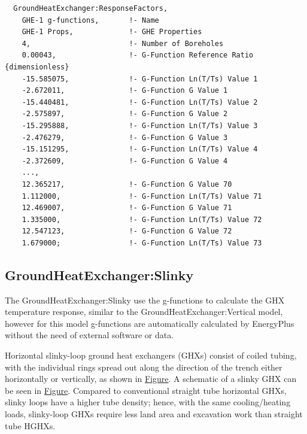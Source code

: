 \begin{lstlisting}
  GroundHeatExchanger:ResponseFactors,
    GHE-1 g-functions,       !- Name
    GHE-1 Props,             !- GHE Properties
    4,                       !- Number of Boreholes
    0.00043,                 !- G-Function Reference Ratio {dimensionless}
    -15.585075,              !- G-Function Ln(T/Ts) Value 1
    -2.672011,               !- G-Function G Value 1
    -15.440481,              !- G-Function Ln(T/Ts) Value 2
    -2.575897,               !- G-Function G Value 2
    -15.295888,              !- G-Function Ln(T/Ts) Value 3
    -2.476279,               !- G-Function G Value 3
    -15.151295,              !- G-Function Ln(T/Ts) Value 4
    -2.372609,               !- G-Function G Value 4
    ...,
    12.365217,               !- G-Function G Value 70
    1.112000,                !- G-Function Ln(T/Ts) Value 71
    12.469007,               !- G-Function G Value 71
    1.335000,                !- G-Function Ln(T/Ts) Value 72
    12.547123,               !- G-Function G Value 72
    1.679000;                !- G-Function Ln(T/Ts) Value 73
\end{lstlisting}

\subsection{GroundHeatExchanger:Slinky}\label{groundheatexchangerslinky}

The GroundHeatExchanger:Slinky use the g-functions to calculate the GHX temperature response, similar to the GroundHeatExchanger:Vertical model, however for this model g-functions are automatically calculated by EnergyPlus without the need of external software or data.

Horizontal slinky-loop ground heat exchangers (GHXs) consist of coiled tubing, with the individual rings spread out along the direction of the trench either horizontally or vertically, as shown in \protect\hyperlink{SlinkyIOFig1}{Figure}. A schematic of a slinky GHX can be seen in \protect\hyperlink{SlinkyIOFig2}{Figure}. Compared to conventional straight tube horizontal GHXs, slinky loops have a higher tube density; hence, with the same cooling/heating loads, slinky-loop GHXs require less land area and excavation work than straight tube HGHXs.

